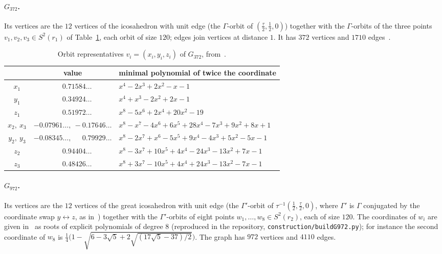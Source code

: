 \documentclass[11pt]{article}
\renewcommand{\_}{\textunderscore\allowbreak}
\theoremstyle{remark}
\begin{document}
\paragraph{$G_{372}$.} Its vertices are the $12$ vertices of the icosahedron with unit edge (the
$\Gamma$-orbit of $(\frac{\tau}{2},\frac12,0)$) together with the $\Gamma$-orbits of the three points
$v_1,v_2,v_3\in S^2(r_1)$ of Table~\ref{tab:poly372}, each orbit of size $120$; edges join vertices at
distance $1$. It has $372$ vertices and $1710$ edges~\cite{VND2022}.

\begin{table}[ht]
\centering\scriptsize\setlength{\tabcolsep}{2.5pt}
\begin{tabular}{ccl}
\toprule
 & value & minimal polynomial of twice the coordinate \\
\midrule
$x_1$ & $\phantom{-}0.71584\ldots$ & $x^4-2x^3+2x^2-x-1$ \\
$y_1$ & $\phantom{-}0.34924\ldots$ & $x^4+x^3-2x^2+2x-1$ \\
$z_1$ & $\phantom{-}0.51972\ldots$ & $x^8-5x^6+2x^4+20x^2-19$ \\
$x_2,\ x_3$ & $-0.07961\ldots,\ -0.17646\ldots$ & $x^8-x^7-4x^6+6x^5+28x^4-7x^3+9x^2+8x+1$ \\
$y_2,\ y_3$ & $-0.08345\ldots,\ \phantom{-}0.79929\ldots$ & $x^8-2x^7+x^6-5x^5+9x^4-4x^3+5x^2-5x-1$ \\
$z_2$ & $\phantom{-}0.94404\ldots$ & $x^8-3x^7+10x^5+4x^4-24x^3-13x^2+7x-1$ \\
$z_3$ & $\phantom{-}0.48426\ldots$ & $x^8+3x^7-10x^5+4x^4+24x^3-13x^2-7x-1$ \\
\bottomrule
\end{tabular}
\caption{Orbit representatives $v_i=(x_i,y_i,z_i)$ of $G_{372}$, from~\cite{VND2022}.}
\label{tab:poly372}
\end{table}

\paragraph{$G_{972}$.} Its vertices are the $12$ vertices of the great icosahedron with unit edge (the
$\Gamma'$-orbit of $\tau^{-1}(\frac12,\frac{\tau}{2},0)$, where $\Gamma'$ is $\Gamma$ conjugated by the
coordinate swap $y\leftrightarrow z$, as in~\cite{VNDrepo}) together with the $\Gamma'$-orbits of eight
points $w_1,\dots,w_8\in S^2(r_2)$, each of size $120$. The coordinates of $w_i$ are given
in~\cite{VNDrepo} as roots of explicit polynomials of degree $8$ (reproduced in the repository, \texttt{construction/build\_G972.py});
for instance the second coordinate of $w_8$ is
$\frac14\bigl(1-\sqrt{6-3\sqrt5+2\sqrt{(17\sqrt5-37)/2}}\bigr)$. The graph has $972$ vertices and $4110$
edges.
\end{document}
